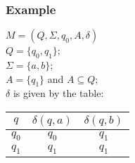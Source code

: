 \begin{frame}
    \frametitle{Example}
    $M = (Q,\Sigma,q_0, A,\delta)$\\
    $Q = \{q_0, q_1\}$;\\
    $\Sigma = \{a,b\}$;\\
    $A = \{q_1\}$ and $A \subseteq Q$;\\

    \vspace{10pt}
    $\delta$ is given by the table:\\

    \begin{tabular}{ c | c c }
        \hline
        $q$ & $\delta(q,a)$ & $\delta(q,b)$ \\
        \hline
        $q_0$ & $q_0$ & $q_1$ \\
        $q_1$ & $q_1$ & $q_1$ \\
        \hline
    \end{tabular}
\end{frame}


